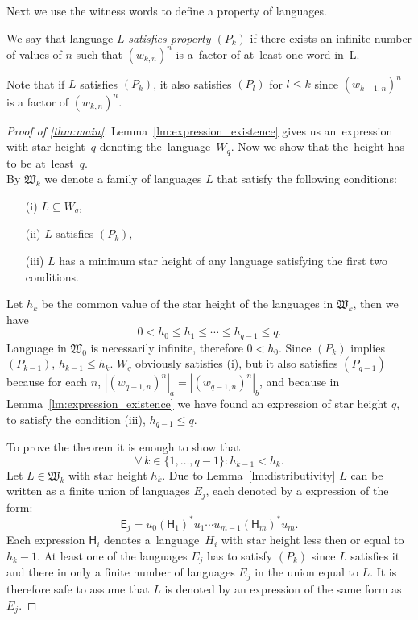 Next we use the witness words to define a property of languages.

\begin{defn}
    We say that language $L$ \emph{satisfies property $(P_k)$} if there exists an infinite number of values of $n$ such that ${(w_{k,n})}^n$ is a~factor of at~least one word in~L.
\end{defn}

Note that if $L$ satisfies $(P_k)$, it also satisfies $(P_l)$ for $l \leq k$ since ${(w_{k-1,n})}^n$ is a factor of ${(w_{k,n})}^n$.

\begin{proof}[Proof of \autoref*{thm:main}]
    Lemma~\ref*{lm:expression_existence} gives us an~expression with star height~$q$ denoting the~language~$W_q$. Now we show that the~height has to be at~least~$q$.\\
    By $\mathfrak{W}_k$ we denote a family of languages $L$ that satisfy the following conditions:
    \begin{enumerate}
        \item[(i)] $L \subseteq W_q$,
        \item[(ii)] $L$ satisfies $(P_k)$,
        \item[(iii)] $L$ has a minimum star height of any language satisfying the first two conditions.
    \end{enumerate}
    Let $h_k$ be the common value of the star height of the languages in $\mathfrak{W}_k$, then we have
    \[
        0 < h_0 \leq h_1 \leq \dotsb \leq h_{q-1} \leq q.
    \]
    Language in $\mathfrak{W}_0$ is necessarily infinite, therefore $0 < h_0$. Since $(P_k)$ implies $(P_{k-1})$, $h_{k-1} \leq h_k$. $W_q$ obviously satisfies (i), but it also satisfies $(P_{q-1})$ because for each $n$, $|{(w_{q-1,n})}^n|_a = |{(w_{q-1,n})}^n|_b$, and because in Lemma~\ref*{lm:expression_existence} we have found an expression of star height $q$, to satisfy the condition (iii), $h_{q-1} \leq q$.

    To prove the theorem it is enough to show that
    \[
        \forall \, k \in \{1,\dotsc,q-1\}: h_{k-1} < h_k.
    \]
    Let $L \in \mathfrak{W}_k$ with star height $h_k$. Due to Lemma~\ref*{lm:distributivity} $L$ can be written as a finite union of languages $E_j$, each denoted by a expression of the form:
    \[
        \mathsf{E}_j = u_0{(\mathsf{H}_1)}^*u_1 \dotsm u_{m-1}{(\mathsf{H}_m)}^*u_m.
    \]
    Each expression $\mathsf{H}_i$ denotes a~language~$H_i$ with star height less then or equal to $h_k-1$. At least one of the languages $E_j$ has to satisfy $(P_k)$ since $L$ satisfies it and there in only a finite number of languages $E_j$ in the union equal to $L$. It is therefore safe to assume that $L$ is denoted by an expression of the same form as $E_j$.


\end{proof}
